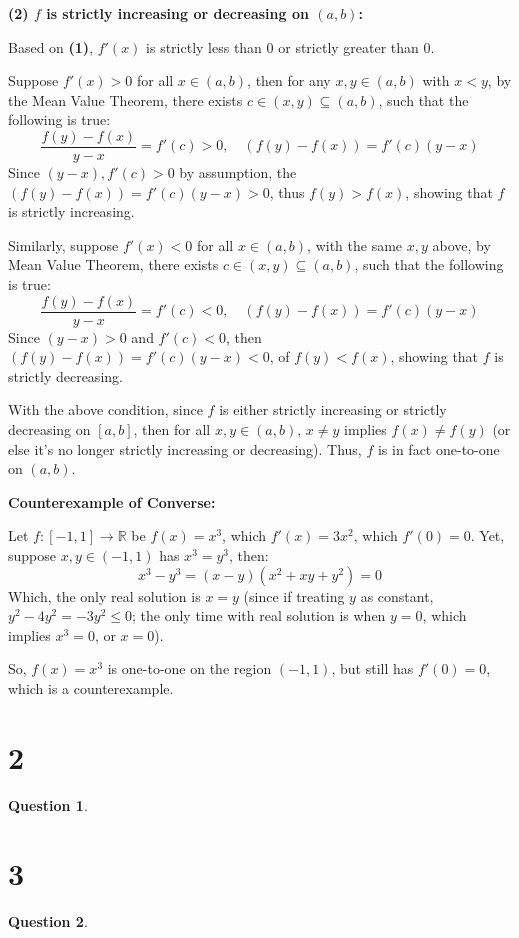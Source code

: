 \documentclass{article}
\newtheorem{question}{Question}
\begin{document}
\textbf{(2) $f$ is strictly increasing or decreasing on $(a,b)$:}

Based on \textbf{(1)}, $f'(x)$ is strictly less than $0$ or strictly greater than $0$.

Suppose $f'(x)>0$ for all $x\in(a,b)$, then for any $x,y\in (a,b)$ with $x<y$, by the Mean Value Theorem, 
there exists $c\in (x,y)\subseteq (a,b)$, such that the following is true:
$$\frac{f(y)-f(x)}{y-x}=f'(c) >0,\quad (f(y)-f(x))=f'(c)(y-x)$$
Since $(y-x), f'(c)>0$ by assumption, the $(f(y)-f(x))=f'(c)(y-x)>0$, thus $f(y)>f(x)$, showing that $f$ is strictly increasing.

Similarly, suppose $f'(x)<0$ for all $x\in (a,b)$, with the same $x,y$ above, by Mean Value Theorem, there exists $c\in(x,y)\subseteq (a,b)$,
such that the following is true:
$$\frac{f(y)-f(x)}{y-x}=f'(c) <0,\quad (f(y)-f(x))=f'(c)(y-x)$$
Since $(y-x)>0$ and $f'(c)<0$, then $(f(y)-f(x))=f'(c)(y-x)<0$, of $f(y)<f(x)$, showing that $f$ is strictly decreasing.

\hfill

With the above condition, since $f$ is either strictly increasing or strictly decreasing on $[a,b]$, 
then for all $x,y\in(a,b)$, $x\neq y$ implies $f(x)\neq f(y)$ (or else it's no longer strictly increasing or decreasing).
Thus, $f$ is in fact one-to-one on $(a,b)$.

\hfill

\textbf{Counterexample of Converse:}

Let $f:[-1,1]\rightarrow \mathbb{R}$ be $f(x)=x^3$, which $f'(x)=3x^2$, which $f'(0)=0$. 
Yet, suppose $x,y\in (-1,1)$ has $x^3=y^3$, then:
$$x^3-y^3=(x-y)(x^2+xy+y^2)=0$$
Which, the only real solution is $x=y$ (since if treating $y$ as constant, $y^2-4y^2=-3y^2\leq 0$; the only time with real solution is when $y=0$, which implies $x^3=0$, or $x=0$).

So, $f(x)=x^3$ is one-to-one on the region $(-1,1)$, but still has $f'(0)=0$, which is a counterexample.

\break

\section*{2}
\begin{question}
    
\end{question}

\break

\section*{3}
\begin{question}
    
\end{question}
\end{document}
